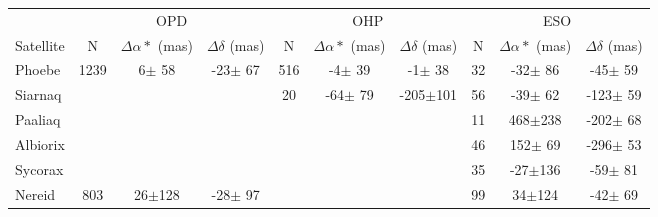 \documentclass[11pt,a4paper]{report}
\begin{document}
\begin{landscape}
\newpage

\begin{table*}
\begin{centering}
\begin{tabular}{l|ccc|ccc|ccc}
\hline  \hline
 & \multicolumn{3}{|c|}{OPD} & \multicolumn{3}{|c|}{OHP} & \multicolumn{3}{|c}{ESO}\tabularnewline
Satellite  & N & $\Delta\alpha*$ (mas) & $\Delta\delta$ (mas) & N & $\Delta\alpha*$ (mas) & $\Delta\delta$ (mas) & N & $\Delta\alpha*$ (mas) & $\Delta\delta$ (mas) \tabularnewline
\hline
Phoebe & 1239 &   6$\pm$ 58 & -23$\pm$ 67 & 516 &  -4$\pm$ 39 &  -1$\pm$ 38 & 32 & -32$\pm$ 86 & -45$\pm$ 59 \tabularnewline
\hdashline
Siarnaq & & &  & 20 & -64$\pm$ 79 & -205$\pm$101 & 56 & -39$\pm$ 62 & -123$\pm$ 59 \tabularnewline
Paaliaq & & &  & & &  & 11 & 468$\pm$238 & -202$\pm$ 68 \tabularnewline
\hdashline
Albiorix  & & &  & & &  & 46 & 152$\pm$ 69 & -296$\pm$ 53 \tabularnewline
\hline
Sycorax & & &  & & &  & 35 & -27$\pm$136 & -59$\pm$ 81 \tabularnewline
\hline
Nereid & 803 &  26$\pm$128 & -28$\pm$ 97 & & &  & 99 &  34$\pm$124 & -42$\pm$ 69 \tabularnewline
\hline
\end{tabular}
\par \end{centering}
\end{table*}

\end{landscape}
\end{document}

